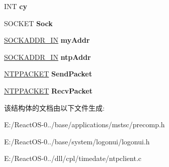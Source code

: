 \begin{DoxyCompactItemize}
I\+NT {\bfseries cy}
\item 
\mbox{\label{struct___i_n_f_o_a9fa5d05064ca55681c29205624619ee3}} 
S\+O\+C\+K\+ET {\bfseries Sock}
\item 
\mbox{\label{struct___i_n_f_o_a4a6b56fc4f74cad11c53bc99434cae04}} 
\hyperlink{structsockaddr__in}{S\+O\+C\+K\+A\+D\+D\+R\+\_\+\+IN} {\bfseries my\+Addr}
\item 
\mbox{\label{struct___i_n_f_o_a344b9c2e3d83a77ce2d2f794a4b25ace}} 
\hyperlink{structsockaddr__in}{S\+O\+C\+K\+A\+D\+D\+R\+\_\+\+IN} {\bfseries ntp\+Addr}
\item 
\mbox{\label{struct___i_n_f_o_a7e269efe6fe4c2f7fd886e193ce8b85e}} 
\hyperlink{struct___n_t_p_p_a_c_k_e_t}{N\+T\+P\+P\+A\+C\+K\+ET} {\bfseries Send\+Packet}
\item 
\mbox{\label{struct___i_n_f_o_a6408818805d4d1f10082fc2659502d35}} 
\hyperlink{struct___n_t_p_p_a_c_k_e_t}{N\+T\+P\+P\+A\+C\+K\+ET} {\bfseries Recv\+Packet}
\end{DoxyCompactItemize}


该结构体的文档由以下文件生成\+:\begin{DoxyCompactItemize}
\item 
E\+:/\+React\+O\+S-\/0../base/applications/mstsc/precomp.\+h\item 
E\+:/\+React\+O\+S-\/0../base/system/logonui/logonui.\+h\item 
E\+:/\+React\+O\+S-\/0../dll/cpl/timedate/ntpclient.\+c\end{DoxyCompactItemize}
